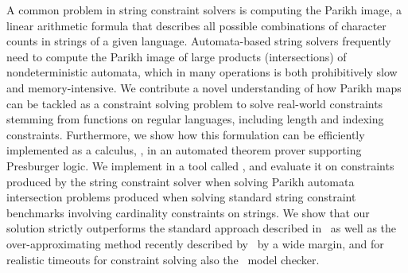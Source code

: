 A common problem in string constraint solvers is computing the Parikh image, a
linear arithmetic formula that describes all possible combinations of character
counts in strings of a given language. Automata-based string solvers frequently
need to compute the Parikh image of large products (intersections) of
nondeterministic automata, which in many operations is both prohibitively slow
and memory-intensive. We contribute a novel understanding of how Parikh maps can
be tackled as a constraint solving problem to solve real-world constraints
stemming from functions on regular languages, including length and indexing
constraints. Furthermore, we show how this formulation can be efficiently
implemented as a calculus, \Calculus{}, in an automated theorem prover
supporting Presburger logic.  We implement \Calculus{} in a tool called
\Catra{}, and evaluate it on constraints produced by the \OstrichPlus{} string
constraint solver when solving Parikh automata intersection problems produced
when solving standard string constraint benchmarks involving cardinality
constraints on strings. We show that our solution strictly outperforms the
standard approach described in~\citeauthor{generate-parikh-image} as well as the
over-approximating method recently described by~\citeauthor{approximate-parikh}
by a wide margin, and for realistic timeouts for constraint solving also
the~\Nuxmv{} model checker.